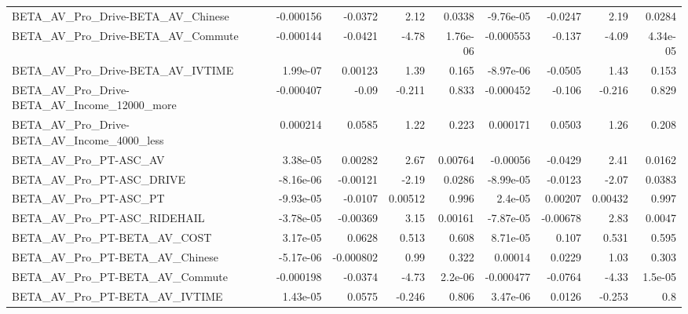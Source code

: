 \begin{tabular}{lrrrrrrrr}
BETA\_AV\_Pro\_Drive-BETA\_AV\_Chinese                  &   -0.000156 &      -0.0372 &      2.12 &   0.0338 &  -9.76e-05 &     -0.0247 &         2.19 &        0.0284 \\
BETA\_AV\_Pro\_Drive-BETA\_AV\_Commute                  &   -0.000144 &      -0.0421 &     -4.78 & 1.76e-06 &  -0.000553 &      -0.137 &        -4.09 &      4.34e-05 \\
BETA\_AV\_Pro\_Drive-BETA\_AV\_IVTIME                   &    1.99e-07 &      0.00123 &      1.39 &    0.165 &  -8.97e-06 &     -0.0505 &         1.43 &         0.153 \\
BETA\_AV\_Pro\_Drive-BETA\_AV\_Income\_12000\_more        &   -0.000407 &        -0.09 &    -0.211 &    0.833 &  -0.000452 &      -0.106 &       -0.216 &         0.829 \\
BETA\_AV\_Pro\_Drive-BETA\_AV\_Income\_4000\_less         &    0.000214 &       0.0585 &      1.22 &    0.223 &   0.000171 &      0.0503 &         1.26 &         0.208 \\
BETA\_AV\_Pro\_PT-ASC\_AV                              &    3.38e-05 &      0.00282 &      2.67 &  0.00764 &   -0.00056 &     -0.0429 &         2.41 &        0.0162 \\
BETA\_AV\_Pro\_PT-ASC\_DRIVE                           &   -8.16e-06 &     -0.00121 &     -2.19 &   0.0286 &  -8.99e-05 &     -0.0123 &        -2.07 &        0.0383 \\
BETA\_AV\_Pro\_PT-ASC\_PT                              &   -9.93e-05 &      -0.0107 &   0.00512 &    0.996 &    2.4e-05 &     0.00207 &      0.00432 &         0.997 \\
BETA\_AV\_Pro\_PT-ASC\_RIDEHAIL                        &   -3.78e-05 &     -0.00369 &      3.15 &  0.00161 &  -7.87e-05 &    -0.00678 &         2.83 &        0.0047 \\
BETA\_AV\_Pro\_PT-BETA\_AV\_COST                        &    3.17e-05 &       0.0628 &     0.513 &    0.608 &   8.71e-05 &       0.107 &        0.531 &         0.595 \\
BETA\_AV\_Pro\_PT-BETA\_AV\_Chinese                     &   -5.17e-06 &    -0.000802 &      0.99 &    0.322 &    0.00014 &      0.0229 &         1.03 &         0.303 \\
BETA\_AV\_Pro\_PT-BETA\_AV\_Commute                     &   -0.000198 &      -0.0374 &     -4.73 &  2.2e-06 &  -0.000477 &     -0.0764 &        -4.33 &       1.5e-05 \\
BETA\_AV\_Pro\_PT-BETA\_AV\_IVTIME                      &    1.43e-05 &       0.0575 &    -0.246 &    0.806 &   3.47e-06 &      0.0126 &       -0.253 &           0.8 \\

\end{tabular}
